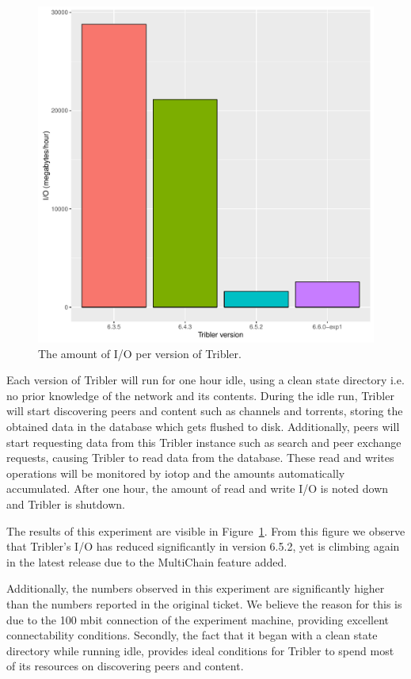 \begin{figure}[!h]
	\centering
	\includegraphics[width=\linewidth]{experimentation/images/io_history}
	\caption{The amount of I/O per version of Tribler.}
	\label{fig:io_history}
\end{figure} 

Each version of Tribler will run for one hour idle, using a clean state directory i.e. no prior knowledge of the network and its contents.
During the idle run, Tribler will start discovering peers and content such as channels and torrents, storing the obtained data in the database which gets flushed to disk.
Additionally, peers will start requesting data from this Tribler instance such as search and peer exchange requests, causing Tribler to read data from the database.
These read and writes operations will be monitored by iotop and the amounts automatically accumulated.
After one hour, the amount of read and write I/O is noted down and Tribler is shutdown.

The results of this experiment are visible in Figure~\ref{fig:io_history}.
From this figure we observe that Tribler's I/O has reduced significantly in version 6.5.2, yet is climbing again in the latest release due to the MultiChain feature added. 

Additionally, the numbers observed in this experiment are significantly higher than the numbers reported in the original ticket.
We believe the reason for this is due to the 100 mbit connection of the experiment machine, providing excellent connectability conditions. 
Secondly, the fact that it began with a clean state directory while running idle, provides ideal conditions for Tribler to spend most of its resources on discovering peers and content.

